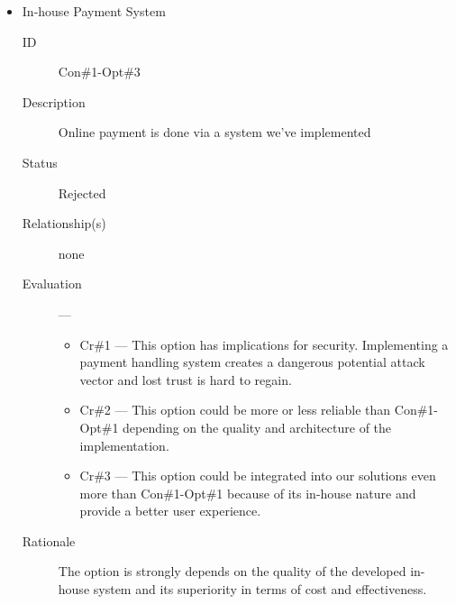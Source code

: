 \documentclass[11pt]{article}
\begin{document}
\begin{itemize}
\item In-house Payment System
\label{sec:orgd5073d5}
\begin{description}
\item[{ID}] Con\#1-Opt\#3
\item[{Description}] Online payment is done via a system we've
implemented
\item[{Status}] Rejected
\item[{Relationship(s)}] none
\item[{Evaluation}] ---
\begin{itemize}
\item Cr\#1 --- This option has implications for
security. Implementing a payment handling
system creates a dangerous potential attack
vector and lost trust is hard to regain.
\item Cr\#2 --- This option could be more or less reliable than
Con\#1-Opt\#1 depending on the quality and architecture of the
implementation.
\item Cr\#3 --- This option could be integrated into our solutions
even more than Con\#1-Opt\#1 because of its in-house nature and
provide a better user experience.
\end{itemize}
\item[{Rationale}] The option is strongly depends on the quality of
the developed in-house system and its superiority
in terms of cost and effectiveness.
\end{description}
\end{itemize}
\end{document}
